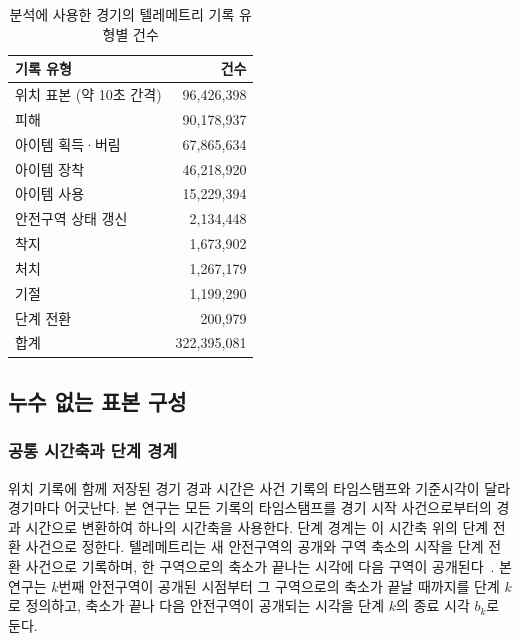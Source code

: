 \begin{table}[t]
\centering
\caption{분석에 사용한 경기의 텔레메트리 기록 유형별 건수}
\label{tab:corpus}
\footnotesize
\begin{tabular}{lr}
\hline
기록 유형 & 건수 \\
\hline
위치 표본 (약 10초 간격) & 96,426,398 \\
피해 & 90,178,937 \\
아이템 획득·버림 & 67,865,634 \\
아이템 장착 & 46,218,920 \\
아이템 사용 & 15,229,394 \\
안전구역 상태 갱신 & 2,134,448 \\
착지 & 1,673,902 \\
처치 & 1,267,179 \\
기절 & 1,199,290 \\
단계 전환 & 200,979 \\
\hline
합계 & 322,395,081 \\
\hline
\end{tabular}
\end{table}

\subsection{누수 없는 표본 구성}
\label{sec:method:samples}


\subsubsection{공통 시간축과 단계 경계}
위치 기록에 함께 저장된 경기 경과 시간은 사건 기록의 타임스탬프와 기준시각이 달라 경기마다 어긋난다.
본 연구는 모든 기록의 타임스탬프를 경기 시작 사건으로부터의 경과 시간으로 변환하여 하나의 시간축을 사용한다.
단계 경계는 이 시간축 위의 단계 전환 사건으로 정한다.
텔레메트리는 새 안전구역의 공개와 구역 축소의 시작을 단계 전환 사건으로 기록하며, 한 구역으로의 축소가 끝나는 시각에 다음 구역이 공개된다~\cite{PUBGAPI}.
본 연구는 $k$번째 안전구역이 공개된 시점부터 그 구역으로의 축소가 끝날 때까지를 단계 $k$로 정의하고, 축소가 끝나 다음 안전구역이 공개되는 시각을 단계 $k$의 종료 시각 $b_k$로 둔다.

